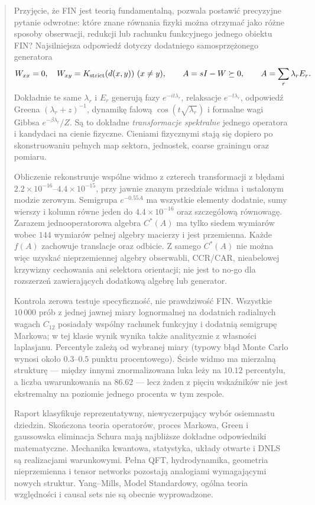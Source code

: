 \documentclass[11pt,a4paper]{article}
\begin{document}
\begin{abstract}
Przyjęcie, że FIN jest teorią fundamentalną, pozwala postawić precyzyjne pytanie odwrotne: które znane równania fizyki można otrzymać jako różne sposoby obserwacji, redukcji lub rachunku funkcyjnego jednego obiektu FIN? Najsilniejsza odpowiedź dotyczy dodatniego samosprzężonego generatora
\[
 W_{xx}=0,\quad W_{xy}=K_{\rm strict}(d(x,y))\ (x\ne y),\qquad
 A=sI-W\succeq0,\qquad
 A=\sum_r\lambda_rE_r.
\]
Dokładnie te same $\lambda_r$ i $E_r$ generują fazy $e^{-it\lambda_r}$, relaksacje $e^{-t\lambda_r}$, odpowiedź Greena $(\lambda_r+z)^{-1}$, dynamikę falową $\cos(t\sqrt{\lambda_r})$ i formalne wagi Gibbsa $e^{-\beta\lambda_r}/Z$. Są to dokładne \emph{transformacje spektralne} jednego operatora i kandydaci na cienie fizyczne. Cieniami fizycznymi stają się dopiero po skonstruowaniu pełnych map sektora, jednostek, coarse grainingu oraz pomiaru.

Obliczenie rekonstruuje wspólne widmo z czterech transformacji z błędami $2.2\times10^{-16}$--$4.4\times10^{-15}$, przy jawnie znanym przedziale widma i ustalonym modzie zerowym. Semigrupa $e^{-0.55A}$ ma wszystkie elementy dodatnie, sumy wierszy i kolumn równe jeden do $4.4\times10^{-16}$ oraz szczegółową równowagę. Zarazem jednooperatorowa algebra $C^*(A)$ ma tylko siedem wymiarów wobec $144$ wymiarów pełnej algebry macierzy i jest przemienna. Każde $f(A)$ zachowuje translacje oraz odbicie. Z samego $C^*(A)$ nie można więc uzyskać nieprzemiennej algebry obserwabli, CCR/CAR, nieabelowej krzywizny cechowania ani selektora orientacji; nie jest to no-go dla rozszerzeń zawierających dodatkową algebrę lub generator.

Kontrola zerowa testuje specyficzność, nie prawdziwość FIN. Wszystkie $10\,000$ prób z jednej jawnej miary lognormalnej na dodatnich radialnych wagach $C_{12}$ posiadały wspólny rachunek funkcyjny i dodatnią semigrupę Markowa; w tej klasie wynik wynika także analitycznie z własności laplasjanu. Percentyle zależą od wybranej miary (typowy błąd Monte Carlo wynosi około $0.3$--$0.5$ punktu procentowego). Ścisłe widmo ma mierzalną strukturę --- między innymi znormalizowana luka leży na $10.12$ percentylu, a liczba uwarunkowania na $86.62$ --- lecz żaden z pięciu wskaźników nie jest ekstremalny na poziomie jednego procenta w tym zespole.

Raport klasyfikuje reprezentatywny, niewyczerpujący wybór osiemnastu dziedzin. Skończona teoria operatorów, proces Markowa, Green i gaussowska eliminacja Schura mają najbliższe dokładne odpowiedniki matematyczne. Mechanika kwantowa, statystyka, układy otwarte i DNLS są realizacjami warunkowymi. Pełna QFT, hydrodynamika, geometria nieprzemienna i tensor networks pozostają analogiami wymagającymi nowych struktur. Yang--Mills, Model Standardowy, ogólna teoria względności i causal sets nie są obecnie wyprowadzone.


\end{abstract}
\end{document}

